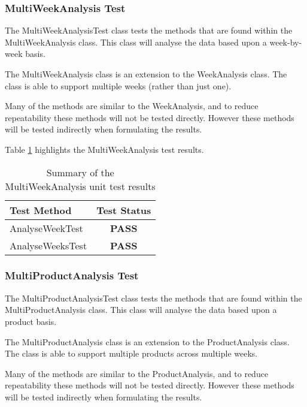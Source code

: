 \subsubsection{MultiWeekAnalysis Test}

The {\ttfamily MultiWeekAnalysisTest} class tests the methods that are found 
within the MultiWeekAnalysis class. This class will analyse the data based upon
a week-by-week basis.

The {\ttfamily MultiWeekAnalysis} class is an extension to the 
{\ttfamily WeekAnalysis} class. The class is able to support multiple weeks
(rather than just one). 

Many of the methods are similar to the WeekAnalysis, and to reduce 
repeatability these methods will not be tested directly. However these methods 
will be tested indirectly when formulating the results.

Table \ref{tab:multiweek_analysis_test} highlights the MultiWeekAnalysis test 
results.

\begin{table}[h]
  \centering
  \begin{tabular}{|l|c|}
    \hline
    {\bfseries Test Method} & {\bfseries Test Status} \\ 
    \hline
    AnalyseWeekTest         & {\bfseries \color{OliveGreen} PASS} \\ 
    AnalyseWeeksTest        & {\bfseries \color{OliveGreen} PASS} \\
    \hline
  \end{tabular}
  \caption[Summary of the MultiWeekAnalysis unit test results]
          {Summary of the MultiWeekAnalysis unit test results}
  \label{tab:multiweek_analysis_test}
\end{table}


\subsubsection{MultiProductAnalysis Test}

The {\ttfamily MultiProductAnalysisTest} class tests the methods that are found 
within the MultiProductAnalysis class. This class will analyse the data based 
upon a product basis.

The {\ttfamily MultiProductAnalysis} class is an extension to the 
{\ttfamily ProductAnalysis} class. The class is able to support multiple 
products across multiple weeks. 

Many of the methods are similar to the ProductAnalysis, and to reduce 
repeatability these methods will not be tested directly. However these methods 
will be tested indirectly when formulating the results.

